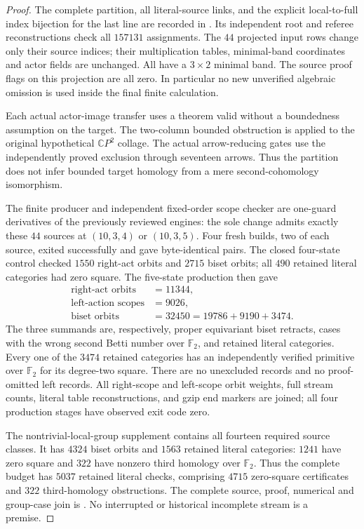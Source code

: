 \begin{proof}
The complete partition, all literal-source links, and the explicit
local-to-full index bijection for the last line are recorded in
.
Its independent root and referee reconstructions check all $157131$
assignments.  The $44$ projected input rows change only their source
indices; their multiplication tables, minimal-band coordinates and
actor fields are unchanged.  All have a $3\times2$ minimal band.
The source proof flags on this projection are all zero.
In particular no new unverified algebraic omission is used inside
the final finite calculation.

Each actual actor-image transfer uses a theorem valid without a
boundedness assumption on the target.  The two-column bounded
obstruction is applied to the original hypothetical $\mathbb CP^2$
collage.  The actual arrow-reducing gates use the independently
proved exclusion through seventeen arrows.  Thus the partition does
not infer bounded target homology from a mere second-cohomology
isomorphism.

The finite producer and independent fixed-order scope checker are
one-guard derivatives of the previously reviewed engines: the sole
change admits exactly these $44$ sources at $(10,3,4)$ or $(10,3,5)$.
Four fresh builds, two of each source, exited successfully and gave
byte-identical pairs.  The closed four-state control checked $1550$
right-act orbits and $2715$ biset orbits; all $490$ retained literal
categories had zero square.  The five-state production then gave
\[
\begin{aligned}
\text{right-act orbits}&=11344,\\
\text{left-action scopes}&=9026,\\
\text{biset orbits}&=32450
   =19786+9190+3474.
\end{aligned}
\]
The three summands are, respectively, proper equivariant biset
retracts, cases with the wrong second Betti number over $\mathbb F_2$, and retained
literal categories.  Every one of the $3474$ retained categories
has an independently verified primitive over $\mathbb F_2$ for its degree-two square.
There are no unexcluded records and no proof-omitted left records.
All right-scope and left-scope orbit weights, full stream counts,
literal table reconstructions, and gzip end markers are joined;
all four production stages have observed exit code zero.

The nontrivial-local-group supplement contains all fourteen required
source classes.  It has $4324$ biset orbits and $1563$ retained
literal categories: $1241$ have zero square and $322$ have nonzero
third homology over $\mathbb F_2$.  Thus the complete budget has $5037$ retained
literal checks, comprising $4715$ zero-square certificates and
$322$ third-homology obstructions.
The complete source, proof, numerical and group-case join is
.
No interrupted or historical incomplete stream is a premise.
\end{proof}


